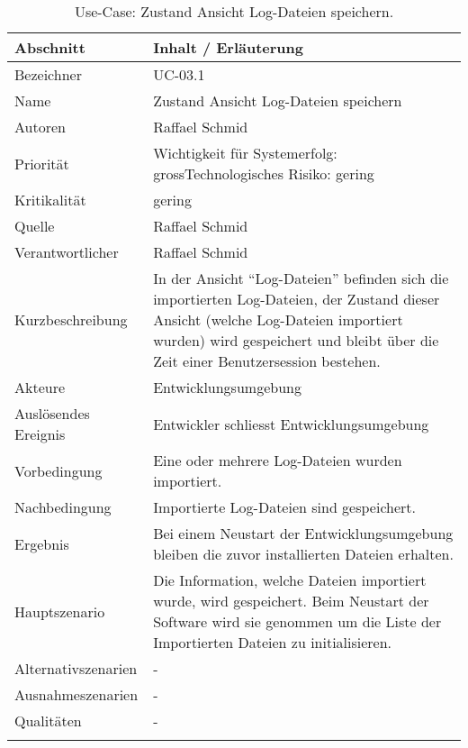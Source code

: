 \begin{longtable}{|p{4cm}|p{10.5cm}|}
\hline
   \textbf{Abschnitt} & \textbf{Inhalt / Erläuterung} \\\hline
   Bezeichner & UC-03.1\\\hline
   Name & Zustand Ansicht Log-Dateien speichern\\\hline
   Autoren & Raffael Schmid\\\hline
   Priorität & Wichtigkeit für Systemerfolg: gross\newline Technologisches Risiko: gering\\\hline
   Kritikalität & gering\\\hline
   Quelle & Raffael Schmid\\\hline
   Verantwortlicher & Raffael Schmid\\\hline
   Kurzbeschreibung & In der Ansicht ``Log-Dateien'' befinden sich die importierten Log-Dateien, der Zustand dieser Ansicht (welche Log-Dateien importiert wurden) wird gespeichert und bleibt über die Zeit einer Benutzersession bestehen.\\\hline
   Akteure & Entwicklungsumgebung\\\hline
   Auslösendes Ereignis & Entwickler schliesst Entwicklungsumgebung\\\hline
   Vorbedingung & Eine oder mehrere Log-Dateien wurden importiert.\\\hline
   Nachbedingung & Importierte Log-Dateien sind gespeichert. \\\hline
   Ergebnis & Bei einem Neustart der Entwicklungsumgebung bleiben die zuvor installierten Dateien erhalten.\\\hline
   Hauptszenario & Die Information, welche Dateien importiert wurde, wird gespeichert. Beim Neustart der Software wird sie genommen um die Liste der Importierten Dateien zu initialisieren.\\\hline
   Alternativszenarien & -\\\hline
   Ausnahmeszenarien & -\\\hline
   Qualitäten & -\\\hline
\caption{Use-Case: Zustand Ansicht Log-Dateien speichern.}
\end{longtable}


